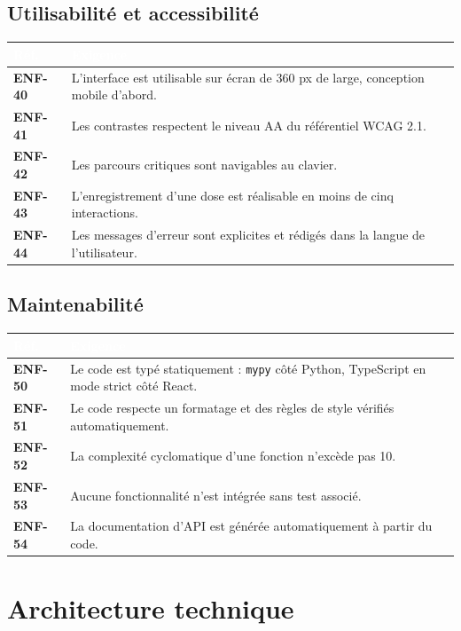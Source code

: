 \documentclass[11pt,a4paper]{article}
\newcommand{\rid}[1]{{\sffamily\bfseries\footnotesize\color{primary}#1}}
\newcommand{\hd}[1]{\textcolor{white}{\sffamily\bfseries\small #1}}
\newcommand{\rowhead}{\rowcolor{primary}}
\begin{document}
\subsection{Utilisabilité et accessibilité}

\noindent
\begin{tabularx}{\textwidth}{@{}C{1.7cm} L@{}}
\toprule
\rowhead \hd{Réf.} & \hd{Exigence} \\
\midrule
\rid{ENF-40} & L'interface est utilisable sur écran de 360 px de large, conception mobile d'abord. \\
\rid{ENF-41} & Les contrastes respectent le niveau AA du référentiel WCAG 2.1. \\
\rid{ENF-42} & Les parcours critiques sont navigables au clavier. \\
\rid{ENF-43} & L'enregistrement d'une dose est réalisable en moins de cinq interactions. \\
\rid{ENF-44} & Les messages d'erreur sont explicites et rédigés dans la langue de l'utilisateur. \\
\bottomrule
\end{tabularx}

\subsection{Maintenabilité}

\noindent
\begin{tabularx}{\textwidth}{@{}C{1.7cm} L@{}}
\toprule
\rowhead \hd{Réf.} & \hd{Exigence} \\
\midrule
\rid{ENF-50} & Le code est typé statiquement : \texttt{mypy} côté Python, TypeScript en mode strict côté React. \\
\rid{ENF-51} & Le code respecte un formatage et des règles de style vérifiés automatiquement. \\
\rid{ENF-52} & La complexité cyclomatique d'une fonction n'excède pas 10. \\
\rid{ENF-53} & Aucune fonctionnalité n'est intégrée sans test associé. \\
\rid{ENF-54} & La documentation d'API est générée automatiquement à partir du code. \\
\bottomrule
\end{tabularx}

\section{Architecture technique}
\end{document}
